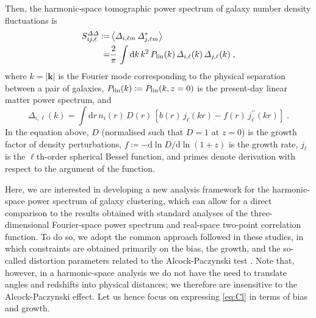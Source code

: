 \documentclass[astrosymb,twocolumn]{aastex631}
\newcommand{\de}{\mathrm{d}}
\newcommand{\stefc}[1]{\textcolor{red}{\textsf{[\textbf{Stef:} #1]}}}
\newcommand{\stef}[1]{\textcolor{red}{#1}}
\begin{document}
Then, the harmonic-space tomographic power spectrum of galaxy number density fluctuations is
\begin{align}
    S^{\varDelta\varDelta}_{ij,\ell}\coloneqq&\left\langle\varDelta_{i,\ell m}\,\varDelta^\ast_{j,\ell m}\right\rangle\label{eq:Cl_DEF}\\
    =&\frac2\pi\,\int\de k\,k^2\,P_{\rm lin}(k)\,\varDelta_{i,\ell}(k)\,\varDelta_{j,\ell}(k)\;,\label{eq:Cl}
\end{align}
where \(k=|\bm k|\) is the Fourier mode corresponding to the physical separation between a pair of galaxies, \(P_{\rm lin}(k)\coloneqq P_{\rm lin}(k,z=0)\) is the present-day linear matter power spectrum, and
\begin{equation}
    \varDelta_{i,\ell}(k)=\int\de r\,n_i( r)\,D( r)\,\left[b( r)\,j_\ell(k r)-f( r)\,j^{\prime\prime}_\ell(k r)\right]\;.\label{eq:Delta_lk}
\end{equation}
In the equation above, \(D\) (normalised such that \(D=1\) at \(z=0\)) is the growth factor of density perturbations, \(f\coloneqq-\de\ln D/\de\ln(1+z)\) is the growth rate, \(j_\ell\) is the \(\ell\)th-order spherical Bessel function, and primes denote derivation with respect to the argument of the function.
% 

Here, we are interested in developing a new analysis framework for the harmonic-space power spectrum of galaxy clustering, which can allow for a direct comparison to the results obtained with standard analyses of the three-dimensional Fourier-space power spectrum and real-space two-point correlation function. To do so, we adopt the common approach followed in these studies, in which constraints are obtained primarily on the bias, the growth, and the so-called distortion parameters related to the Alcock-Paczynski test \citep[see e.g.][\S~3.2.1]{2020A&A...642A.191E}. Note that, however, in a harmonic-space analysis we do not have the need to translate angles and redshifts into physical distances; we therefore are insensitive to the Alcock-Paczynski effect. Let us hence focus on expressing \autoref{eq:Cl} in terms of bias and growth.
\end{document}
